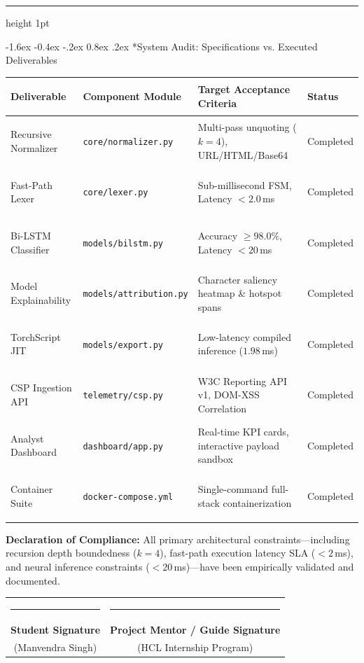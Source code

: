 \documentclass[11pt,a4paper]{article}
\makeatletter
\renewcommand{\section}{\@startsection{section}{1}{\z@}%
  {-1.6ex \@plus -0.4ex \@minus -.2ex}%
  {0.8ex \@plus .2ex}%
  {\normalfont\large\bfseries\color{primaryblue}}}
\makeatother
\begin{document}
\vspace{0.3em}
\hrule height 1pt
\vspace{0.8em}

\section*{System Audit: Specifications vs. Executed Deliverables}
\begin{table}[htbp]
\centering
\footnotesize
\begin{tabularx}{\textwidth}{>{\bfseries\raggedright\arraybackslash}p{2.6cm} >{\raggedright\arraybackslash}p{3.4cm} >{\raggedright\arraybackslash}X >{\centering\arraybackslash}p{1.8cm}}
\toprule
\textbf{Deliverable} & \textbf{Component Module} & \textbf{Target Acceptance Criteria} & \textbf{Status} \\
\midrule
Recursive Normalizer & \texttt{core/normalizer.py} & Multi-pass unquoting ($k=4$), URL/HTML/Base64 & Completed \\
\addlinespace
Fast-Path Lexer & \texttt{core/lexer.py} & Sub-millisecond FSM, Latency $< 2.0$\,ms & Completed \\
\addlinespace
Bi-LSTM Classifier & \texttt{models/bilstm.py} & Accuracy $\ge 98.0\%$, Latency $< 20$\,ms & Completed \\
\addlinespace
Model Explainability & \texttt{models/attribution.py} & Character saliency heatmap \& hotspot spans & Completed \\
\addlinespace
TorchScript JIT & \texttt{models/export.py} & Low-latency compiled inference ($1.98$\,ms) & Completed \\
\addlinespace
CSP Ingestion API & \texttt{telemetry/csp.py} & W3C Reporting API v1, DOM-XSS Correlation & Completed \\
\addlinespace
Analyst Dashboard & \texttt{dashboard/app.py} & Real-time KPI cards, interactive payload sandbox & Completed \\
\addlinespace
Container Suite & \texttt{docker-compose.yml} & Single-command full-stack containerization & Completed \\
\bottomrule
\end{tabularx}
\end{table}

\vspace{2.0em}

\noindent
\textbf{Declaration of Compliance:} All primary architectural constraints—including recursion depth boundedness ($k=4$), fast-path execution latency SLA ($< 2$\,ms), and neural inference constraints ($< 20$\,ms)—have been empirically validated and documented.

\vspace{3.5em}
\begin{flushright}
\begin{tabular}{cc}
\rule{5.0cm}{0.4pt} & \rule{5.0cm}{0.4pt} \\
\textbf{Student Signature} & \textbf{Project Mentor / Guide Signature} \\
\footnotesize (Manvendra Singh) & \footnotesize (HCL Internship Program) \\
\end{tabular}
\end{flushright}
\end{document}
